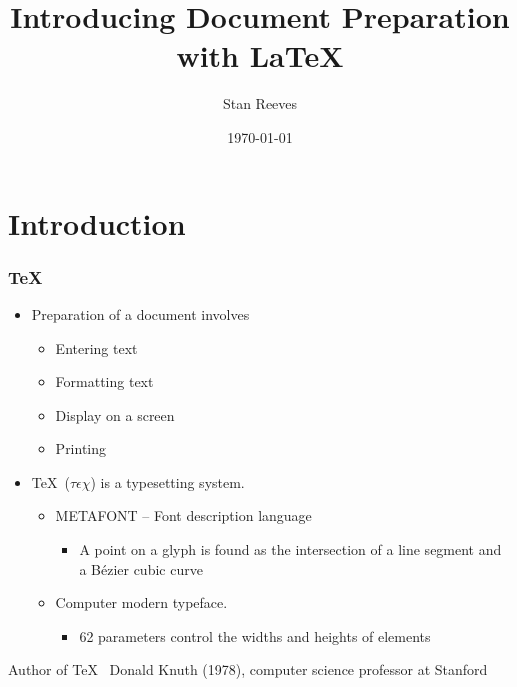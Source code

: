 \documentclass{beamer}
\title{Introducing Document Preparation with  \LaTeX }
\author{{Stan Reeves}}
\institute{Department of Electrical and Computer Engineering}
\date{\today}
\begin{document}
\frame{\titlepage}

\section{Introduction}
\frame
{
\frametitle{\TeX\ }
\begin{itemize}

    \item Preparation of a document involves
    \begin{itemize}
        \item Entering text
        \item \textcolor[rgb]{0.00,0.00,1.00}{Formatting text}
        \item Display on a screen
        \item Printing
    \end{itemize}
\pause
    \item \TeX\ ($\tau\epsilon\chi$) is a typesetting system.
    \begin{itemize}
        \item METAFONT -- Font description language
        \begin{itemize}
            \item A point on a glyph is found as the intersection of a line segment and a B\'{e}zier cubic curve
        \end{itemize}
        \item Computer modern typeface.
        \begin{itemize}
            \item 62 parameters control the widths and heights of elements
        \end{itemize}
    \end{itemize}
\end{itemize}
%
%
\begin{beamerboxesrounded}[upper=uppercol,lower=lowercol,shadow=true]
{Author of \TeX\ }
Donald Knuth (1978), computer science professor at Stanford
\end{beamerboxesrounded}

}
\end{document}
